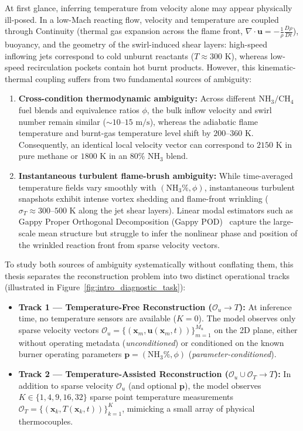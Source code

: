 At first glance, inferring temperature from velocity alone may appear physically ill-posed. In a low-Mach reacting flow, velocity and temperature are coupled through Continuity (thermal gas expansion across the flame front, $\nabla \cdot \mathbf{u} = -\frac{1}{\rho}\frac{D\rho}{Dt}$), buoyancy, and the geometry of the swirl-induced shear layers: high-speed inflowing jets correspond to cold unburnt reactants ($T \approx 300\text{ K}$), whereas low-speed recirculation pockets contain hot burnt products. However, this kinematic-thermal coupling suffers from two fundamental sources of ambiguity:
\begin{enumerate}
    \item \textbf{Cross-condition thermodynamic ambiguity:} Across different $\text{NH}_3/\text{CH}_4$ fuel blends and equivalence ratios $\phi$, the bulk inflow velocity and swirl number remain similar ($\sim 10\text{--}15\text{ m/s}$), whereas the adiabatic flame temperature and burnt-gas temperature level shift by $200\text{--}360\text{ K}$. Consequently, an identical local velocity vector can correspond to $2150\text{ K}$ in pure methane or $1800\text{ K}$ in an $80\%\text{ NH}_3$ blend.
    \item \textbf{Instantaneous turbulent flame-brush ambiguity:} While time-averaged temperature fields vary smoothly with $(\text{NH}_3\%, \phi)$, instantaneous turbulent snapshots exhibit intense vortex shedding and flame-front wrinkling ($\sigma_T \approx 300\text{--}500\text{ K}$ along the jet shear layers). Linear modal estimators such as Gappy Proper Orthogonal Decomposition (Gappy POD)~\cite{everson1995karhunen} capture the large-scale mean structure but struggle to infer the nonlinear phase and position of the wrinkled reaction front from sparse velocity vectors.
\end{enumerate}

To study both sources of ambiguity systematically without conflating them, this thesis separates the reconstruction problem into two distinct operational tracks (illustrated in Figure~\ref{fig:intro_diagnostic_task}):
\begin{itemize}
    \item \textbf{Track 1 --- Temperature-Free Reconstruction ($\mathcal{O}_u \rightarrow T$):} At inference time, no temperature sensors are available ($K = 0$). The model observes only sparse velocity vectors $\mathcal{O}_u = \{(\mathbf{x}_m, \mathbf{u}(\mathbf{x}_m, t))\}_{m=1}^{M_u}$ on the 2D plane, either without operating metadata (\emph{unconditioned}) or conditioned on the known burner operating parameters $\mathbf{p} = (\text{NH}_3\%, \phi)$ (\emph{parameter-conditioned}).
    \item \textbf{Track 2 --- Temperature-Assisted Reconstruction ($\mathcal{O}_u \cup \mathcal{O}_T \rightarrow T$):} In addition to sparse velocity $\mathcal{O}_u$ (and optional $\mathbf{p}$), the model observes $K \in \{1, 4, 9, 16, 32\}$ sparse point temperature measurements $\mathcal{O}_T = \{(\mathbf{x}_k, T(\mathbf{x}_k, t))\}_{k=1}^K$, mimicking a small array of physical thermocouples.
\end{itemize}

